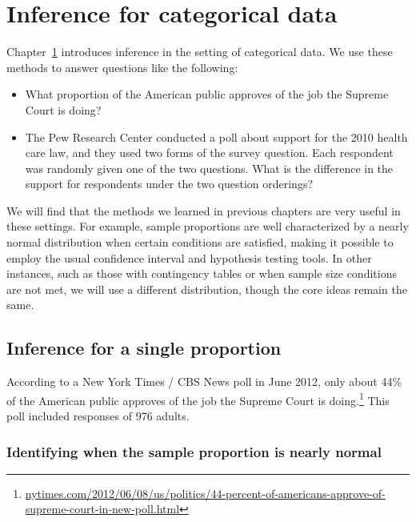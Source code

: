 
\chapter{Inference for categorical data}
\label{inferenceForCategoricalData}

Chapter~\ref{inferenceForCategoricalData} introduces inference in the setting of categorical data. We use these methods to answer questions like the following:
\begin{itemize}
\setlength{\itemsep}{0mm}
\item What proportion of the American public approves of the job the Supreme Court is doing?
\item The Pew Research Center conducted a poll about support for the 2010 health care law, and they used two forms of the survey question. Each respondent was randomly given one of the two questions. What is the difference in the support for respondents under the two question orderings?
\end{itemize}
We will find that the methods we learned in previous chapters are very useful in these settings. For example, sample proportions are well characterized by a nearly normal distribution when certain conditions are satisfied, making it possible to employ the usual confidence interval and hypothesis testing tools. In other instances, such as those with contingency tables or when sample size conditions are not met, we will use a different distribution, though the core ideas remain the same.


\section{Inference for a single proportion}
\label{singleProportion}


According to a New York Times / CBS News poll in June 2012, only about 44\% of the American public approves of the job the Supreme Court is doing.\footnote{\href{http://www.nytimes.com/2012/06/08/us/politics/44-percent-of-americans-approve-of-supreme-court-in-new-poll.html}{\scriptsize nytimes.com/2012/06/08/us/politics/44-percent-of-americans-approve-of-supreme-court-in-new-poll.html}} This poll included responses of 976 adults.


\subsection{Identifying when the sample proportion is nearly normal}

